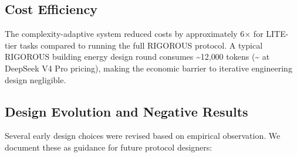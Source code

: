 \documentclass[11pt,a4paper]{article}
\begin{document}
\subsection{Cost Efficiency}

The complexity-adaptive system reduced costs by approximately 6$\times$ for LITE-tier tasks compared to running the full RIGOROUS protocol. A typical RIGOROUS building energy design round consumes \textasciitilde12{,}000 tokens (\textasciitilde{} at DeepSeek V4 Pro pricing), making the economic barrier to iterative engineering design negligible.

\subsection{Design Evolution and Negative Results}

Several early design choices were revised based on empirical observation. We document these as guidance for future protocol designers:
\end{document}
